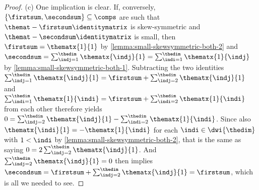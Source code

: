 \documentclass[pdftex]{sigma}
\numberwithin{equation}{section}
\begin{document}
{\begin{proof}
    (c)
    One implication is clear. If, conversely, $\{\firstsum,\secondsum\}\subseteq\comps$ are such that $\themat-\firstsum\identitymatrix$ is skew-symmetric and $\themat-\secondsum\identitymatrix$ is small, then $\firstsum=\thematx{1}{1}$ by \ref{lemma:small-skewsymmetric-both-2} and $\secondsum=\sum_{\indj=1}^\thedim\thematx{\indj}{1}=\sum_{\indi=1}^\thedim\thematx{1}{\indj}$ by \ref{lemma:small-skewsymmetric-both-1}. Subtracting the two identities $\sum_{\indj=1}^\thedim\thematx{\indj}{1}=\firstsum+\sum_{\indj=2}^\thedim\thematx{\indj}{1}$ and $\sum_{\indi=1}^\thedim\thematx{1}{\indi}=\firstsum+\sum_{\indi=2}^\thedim\thematx{1}{\indi}$ from each other therefore yields $0=\sum_{\indj=2}^\thedim\thematx{\indj}{1}-\sum_{\indi=2}^\thedim\thematx{1}{\indi}$. Since also  $\thematx{\indi}{1}=-\thematx{1}{\indi}$ for each $\indi\in\dwi{\thedim}$ with $1<\indi$ by \ref{lemma:small-skewsymmetric-both-2}, that is the same as saying $0=2\sum_{\indj=2}^\thedim\thematx{\indj}{1}$. And $\sum_{\indj=2}^\thedim\thematx{\indj}{1}=0$ then implies $\secondsum=\firstsum+\sum_{\indj=2}^\thedim\thematx{\indj}{1}=\firstsum$, which is all we needed to see.
\end{proof}
}
\end{document}
